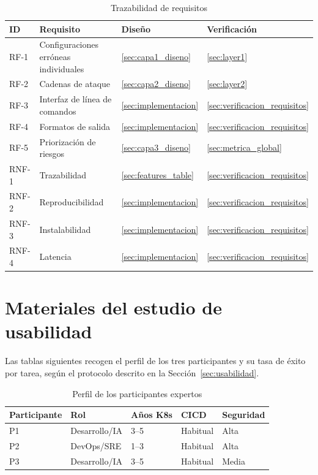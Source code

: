 \begin{table}[htbp]
\centering\small
\caption{Trazabilidad de requisitos}
\label{tab:trazabilidad}
\begin{tabularx}{\textwidth}{@{}lLll@{}}
\toprule
ID & Requisito & Diseño & Verificación \\
\midrule
RF-1  & Configuraciones erróneas individuales & \ref{sec:capa1_diseno}  & \ref{sec:layer1} \\
RF-2  & Cadenas de ataque               & \ref{sec:capa2_diseno}  & \ref{sec:layer2} \\
RF-3  & Interfaz de línea de comandos   & \ref{sec:implementacion} & \ref{sec:verificacion_requisitos} \\
RF-4  & Formatos de salida              & \ref{sec:implementacion} & \ref{sec:verificacion_requisitos} \\
RF-5  & Priorización de riesgos         & \ref{sec:capa3_diseno}  & \ref{sec:metrica_global} \\
RNF-1 & Trazabilidad                    & \ref{sec:features_table} & \ref{sec:verificacion_requisitos} \\
RNF-2 & Reproducibilidad                & \ref{sec:implementacion} & \ref{sec:verificacion_requisitos} \\
RNF-3 & Instalabilidad                  & \ref{sec:implementacion} & \ref{sec:verificacion_requisitos} \\
RNF-4 & Latencia                        & \ref{sec:implementacion} & \ref{sec:verificacion_requisitos} \\
\bottomrule
\end{tabularx}
\fuentepropia
\end{table}

\section{Materiales del estudio de usabilidad}

Las tablas siguientes recogen el perfil de los tres participantes y su tasa de
éxito por tarea, según el protocolo descrito en la
Sección~\ref{sec:usabilidad}.

\begin{table}[htbp]
\centering
\caption{Perfil de los participantes expertos}
\label{tab:usab_perfil}
\begin{tabular}{@{}lllll@{}}
\toprule
Participante & Rol & Años K8s & \acs{CICD} & Seguridad \\
\midrule
P1 & Desarrollo/IA & 3--5 & Habitual & Alta \\
P2 & DevOps/SRE    & 1--3 & Habitual & Alta \\
P3 & Desarrollo/IA & 3--5 & Habitual & Media \\
\bottomrule
\end{tabular}
\fuentepropia
\end{table}

